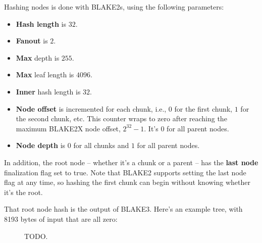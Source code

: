 \documentclass[11pt,notitlepage,a4paper]{article}
\newcommand{\name}{BLAKE3\xspace}
\begin{document}
Hashing nodes is done with BLAKE2s, using the following parameters:
\begin{itemize}
\item \textbf{Hash length} is $32$.
\item \textbf{Fanout} is $2$.
\item \textbf{Max} depth is $255$.
\item \textbf{Max} leaf length is $4096$.
\item \textbf{Inner} hash length is $32$.
\item \textbf{Node offset} is incremented for each chunk, i.e., $0$ for the first chunk, $1$ for the second chunk, etc. This counter wraps to zero after reaching the maximum BLAKE2X node offset, $2^{32}-1$. It's $0$ for all parent nodes.
\item \textbf{Node depth} is $0$ for all chunks and $1$ for all parent nodes.
\end{itemize}
In addition, the root node -- whether it's a chunk or a parent -- has the \textbf{last node} finalization flag set to true. Note that BLAKE2 supports setting the last node flag at any time, so hashing the first chunk can begin without knowing whether it's the root.

That root node hash is the output of \name. Here's an example tree, with 8193 bytes of input that are all zero:
\begin{figure}[h]
\centering
TODO.
\end{figure}
\end{document}

